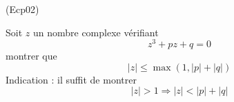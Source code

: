 \begin{tiny}(Ecp02)\end{tiny}
Soit $z$ un nombre complexe v{\'e}rifiant
\[z^3+pz+q=0\]
montrer que
\[|z|\leq \max (1,|p|+|q|)\]
Indication : il suffit de montrer
\[|z|>1 \Rightarrow |z|< |p|+|q|\]